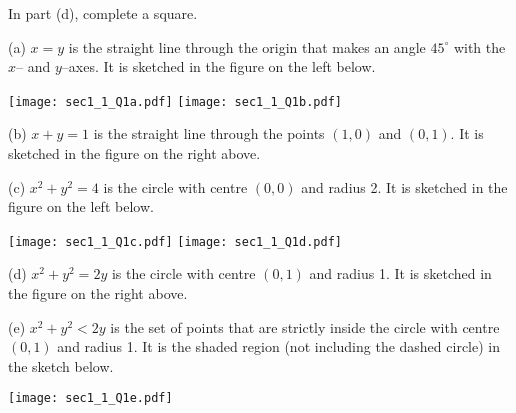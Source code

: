 \begin{hint}
In part (d), complete a square.
\end{hint}

\begin{answer}
(a) $x=y$ is the straight line through the origin that makes an 
angle $45^\circ$ with the $x$-- and $y$--axes. It is sketched in the 
figure on the left below.

\begin{center}
     \texttt{[image: sec1\_1\_Q1a.pdf]}\qquad\qquad
     \texttt{[image: sec1\_1\_Q1b.pdf]}
\end{center}

(b) $x+y=1$ is the straight line through the points $(1,0)$ and
$(0,1)$. It is sketched in the figure on the right above.

(c) $x^2+y^2=4$ is the circle with centre $(0,0)$ and radius 2. It is 
sketched in the figure on the left below.

\begin{center}
     \texttt{[image: sec1\_1\_Q1c.pdf]}\qquad\qquad
     \texttt{[image: sec1\_1\_Q1d.pdf]}
\end{center}

(d) $x^2+y^2=2y$ is the circle with centre $(0,1)$ and radius 1.
It is sketched in the figure on the right above.

(e) $x^2+y^2<2y$ is the set of points that are strictly inside 
the circle with centre $(0,1)$ and radius 1.
It is the shaded region (not including the dashed circle) in the sketch below.

\begin{center}
     \texttt{[image: sec1\_1\_Q1e.pdf]}
\end{center}

\end{answer}

